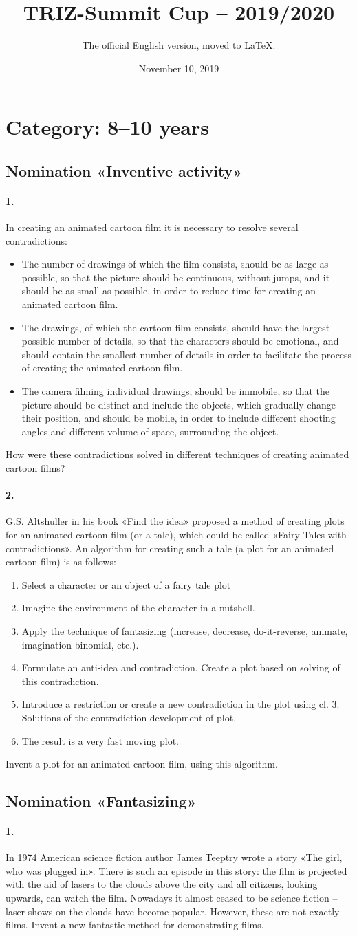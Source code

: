 \documentclass[11pt,a4paper]{article}
\title{TRIZ-Summit Cup – 2019/2020}
\author{The official English version, moved to \LaTeX.}
\date{November 10, 2019}
\newcommand{\contradictions}{ In creating an animated cartoon film it is
  necessary to resolve several contradictions:
\begin {itemize}
\item The number of drawings of which the film consists, should be as large as
  possible, so that the picture should be continuous, without jumps, and it
  should be as small as possible, in order to reduce time for creating an
  animated cartoon film.
\item The drawings, of which the cartoon film consists, should have the
  largest possible number of details, so that the characters should be
  emotional, and should contain the smallest number of details in order to
  facilitate the process of creating the animated cartoon film.
\item The camera filming individual drawings, should be immobile, so that the
  picture should be distinct and include the objects, which gradually change
  their position, and should be mobile, in order to include different shooting
  angles and different volume of space, surrounding the object.
\end{itemize}
How were these contradictions solved in different techniques of creating
animated cartoon films?
}
\begin{document}
\maketitle

\section{Category: 8--10 years }

\subsection*{Nomination «Inventive activity»}

\paragraph{1.}
\contradictions

\paragraph{2.}
G.S. Altshuller in his book «Find the idea» proposed a method of creating
plots for an animated cartoon film (or a tale), which could be called «Fairy
Tales with contradictions». An algorithm for creating such a tale (a plot for
an animated cartoon film) is as follows:
\begin{enumerate}
\item Select a character or an object of a fairy tale plot
\item Imagine the environment of the character in a nutshell.
\item Apply the technique of fantasizing (increase, decrease, do-it-reverse,
  animate, imagination binomial, etc.). 
\item Formulate an anti-idea and contradiction. Create a plot based on solving
  of this contradiction. 
\item Introduce a restriction or create a new contradiction in the plot using
  cl. 3. Solutions of the contradiction-development of plot.
\item The result is a very fast moving plot.
\end{enumerate}
Invent a plot for an animated cartoon film, using this algorithm.

\subsection*{Nomination «Fantasizing»}

\paragraph{1.}
In 1974 American science fiction author James Teeptry wrote a story «The girl,
who was plugged in». There is such an episode in this story: the film is
projected with the aid of lasers to the clouds above the city and all
citizens, looking upwards, can watch the film. Nowadays it almost ceased to be
science fiction – laser shows on the clouds have become popular. However,
these are not exactly films. Invent a new fantastic method for demonstrating
films.
\end{document}
